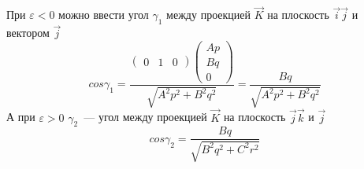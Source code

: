 \documentclass{article}
\begin{document}
При \begin{math} \varepsilon<0 \end{math} можно ввести угол \begin{math} \gamma_1 \end{math} между проекцией \begin{math} \vec{K} \end{math} на плоскость \begin{math} \vec{i}\vec{j} \end{math} и вектором \begin{math} \vec{j} \end{math}
\begin{equation}
\label{gamma1}
cos\gamma_1=
\frac{
\left(
\begin{array}{lcr}
0 & 1 & 0
\end{array}
\right)
\left(
\begin{array}{lcr}
Ap\\ Bq\\ 0
\end{array}
\right)
}
{\sqrt{A^2p^2+B^2q^2}}=
\frac{Bq}{\sqrt{A^2p^2+B^2q^2}}
\end{equation}
А при \begin{math} \varepsilon>0 \end{math} \begin{math} \gamma_2 \end{math}~--- угол между проекцией \begin{math} \vec{K} \end{math} на плоскость \begin{math} \vec{j}\vec{k} \end{math} и \begin{math} \vec{j} \end{math}
\begin{equation}
\label{gamma2}
cos\gamma_2=
\frac{Bq}{\sqrt{B^2q^2+C^2r^2}}
\end{equation}
\end{document}
